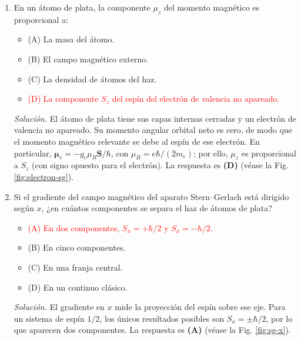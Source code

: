 \documentclass[11pt]{article}
\begin{document}
\begin{enumerate}
    \item En un átomo de plata, la componente $\mu_z$ del momento magnético es proporcional a:
    \begin{itemize}
        \item (A) La masa del átomo.
        \item (B) El campo magnético externo.
        \item (C) La densidad de átomos del haz.
        \item \textcolor{red}{(D) La componente $S_z$ del espín del electrón de valencia no apareado.}
    \end{itemize}
    \textit{Solución.} El átomo de plata tiene sus capas internas cerradas y un electrón de valencia no apareado. Su momento angular orbital neto es cero, de modo que el momento magnético relevante se debe al espín de ese electrón. En particular, $\boldsymbol{\mu}_e=-g_e\mu_B\mathbf{S}/\hbar$, con $\mu_B=e\hbar/(2m_e)$; por ello, $\mu_z$ es proporcional a $S_z$ (con signo opuesto para el electrón). La respuesta es \textbf{(D)} (véase la Fig. \ref{fig:electron-sg}). \parencite[Sec. 18.2, pp. 581--583]{chaparro2026}

    \item Si el gradiente del campo magnético del aparato Stern--Gerlach está dirigido según $x$, ¿en cuántos componentes se separa el haz de átomos de plata?
    \begin{itemize}
        \item \textcolor{red}{(A) En dos componentes, $S_x=+\hbar/2$ y $S_x=-\hbar/2$.}
        \item (B) En cinco componentes.
        \item (C) En una franja central.
        \item (D) En un continuo clásico.
    \end{itemize}
    \textit{Solución.} El gradiente en $x$ mide la proyección del espín sobre ese eje. Para un sistema de espín $1/2$, los únicos resultados posibles son $S_x=\pm\hbar/2$, por lo que aparecen dos componentes. La respuesta es \textbf{(A)} (véase la Fig. \ref{fig:sg-x}). \parencite[Secs. 18.2.1 y 18.2.3, pp. 583--585, 593--595]{chaparro2026}
    


\end{enumerate}
\end{document}
